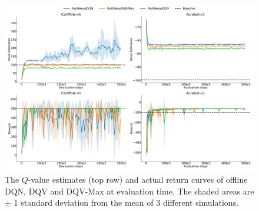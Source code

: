 \begin{figure}[!tbp]
  \centering
  \includegraphics[width=.5\textwidth]{img/dshift_plots_ensembles.png}
  \caption{The $Q$-value estimates (top row) and actual return curves
    of offline DQN, DQV and DQV-Max at evaluation time. The shaded
    areas are $\pm$ 1 standard deviation from the mean of 3 different
    simulations.}\label{fig:dshift_offline_ensembles}
\end{figure}